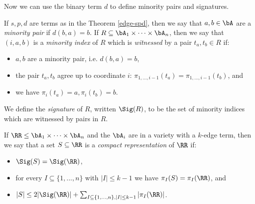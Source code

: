 Now we can use the binary term $d$ to define minority pairs and signatures.

\begin{defn} If $s,p,d$ are terms as in the Theorem \ref{edge-spd}, then we say that $a,b \in \bA$ are a \emph{minority pair} if $d(b,a) = b$. If $R \subseteq \bA_1 \times \cdots \times \bA_n$, then we say that $(i,a,b)$ is a \emph{minority index} of $R$ which is \emph{witnessed} by a pair $t_a, t_b \in R$ if:
\begin{itemize}
\item $a,b$ are a minority pair, i.e. $d(b,a) = b$,

\item the pair $t_a, t_b$ agree up to coordinate $i$: $\pi_{1, ..., i-1}(t_a) = \pi_{1, ..., i-1}(t_b)$, and

\item we have $\pi_i(t_a) = a, \pi_i(t_b) = b$.
\end{itemize}
We define the \emph{signature} of $R$, written $\Sig(R)$, to be the set of minority indices which are witnessed by pairs in $R$.
\end{defn}

\begin{defn} If $\RR \le \bA_1 \times \cdots \times \bA_n$ and the $\bA_i$ are in a variety with a $k$-edge term, then we say that a set $S \subseteq \RR$ is a \emph{compact representation} of $\RR$ if:
\begin{itemize}
\item $\Sig(S) = \Sig(\RR)$,

\item for every $I \subseteq \{1, ..., n\}$ with $|I| \le k-1$ we have $\pi_I(S) = \pi_I(\RR)$, and

\item $|S| \le 2|\Sig(\RR)| + \sum_{I \subseteq \{1,...,n\}, |I| \le k-1} |\pi_I(\RR)|$.
\end{itemize}
\end{defn}

